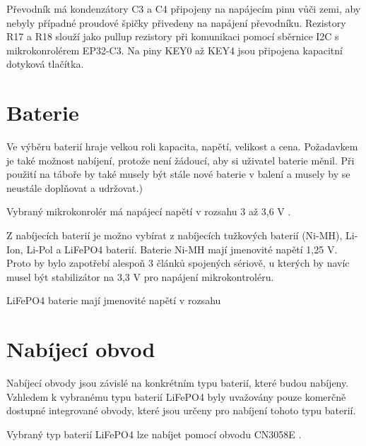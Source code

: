 Převodník má kondenzátory C3 a C4 připojeny na napájecím pinu vůči zemi, aby nebyly případné proudové špičky přivedeny na napájení převodníku. Rezistory
R17 a R18 slouží jako pullup rezistory při komunikaci pomocí sběrnice I2C s mikrokonrolérem EP32-C3. Na piny KEY0 až KEY4 jsou připojena kapacitní 
dotyková tlačítka.  


\section{Baterie}
Ve výběru baterií hraje velkou roli kapacita, napětí, velikost a cena. Požadavkem je také možnost nabíjení, protože není žádoucí, aby si uživatel
baterie měnil. Při použití na táboře by také musely být stále nové baterie v balení a musely by se neustále doplňovat a udržovat.)


Vybraný mikrokonrolér má napájecí napětí v rozsahu 3 až 3,6 V \cite{ESP_C3_dtsh}. 

Z nabíjecích baterií je možno vybírat z nabíjecích tužkových baterií (Ni-MH), Li-Ion, Li-Pol a LiFePO4 baterií.
Baterie Ni-MH mají jmenovité napětí 1,25 V. %
Proto by bylo zapotřebí alespoň 3 článků spojených sériově, u kterých by navíc musel být stabilizátor
na 3,3 V pro napájení mikrokontroléru. %


LiFePO4 baterie mají jmenovité napětí v rozsahu %



\section{Nabíjecí obvod}
Nabíjecí obvody jsou závislé na konkrétním typu baterií, které budou nabíjeny. Vzhledem k vybranému typu baterií LiFePO4 byly uvažovány pouze komerčně
dostupné integrované obvody, které jsou určeny pro nabíjení tohoto typu baterií. 

Vybraný typ baterií LiFePO4 lze nabíjet pomocí obvodu CN3058E \cite{charger_dtsh}. 


